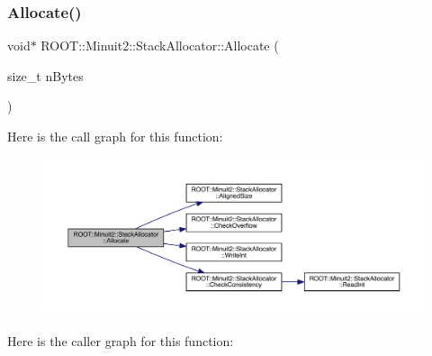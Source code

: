 \subsubsection{\texorpdfstring{Allocate()}{Allocate()}\hspace{0.1cm}{\footnotesize\ttfamily [3/3]}}
{\footnotesize\ttfamily void$\ast$ R\+O\+O\+T\+::\+Minuit2\+::\+Stack\+Allocator\+::\+Allocate (\begin{DoxyParamCaption}\item[{size\+\_\+t}]{n\+Bytes }\end{DoxyParamCaption})\hspace{0.3cm}{\ttfamily [inline]}}

Here is the call graph for this function\+:
\nopagebreak
\begin{figure}[H]
\begin{center}
\leavevmode
\includegraphics[width=350pt]{d3/d1e/classROOT_1_1Minuit2_1_1StackAllocator_a1fb4d1744055446776080af229679e03_cgraph}
\end{center}
\end{figure}
Here is the caller graph for this function\+:
\nopagebreak
